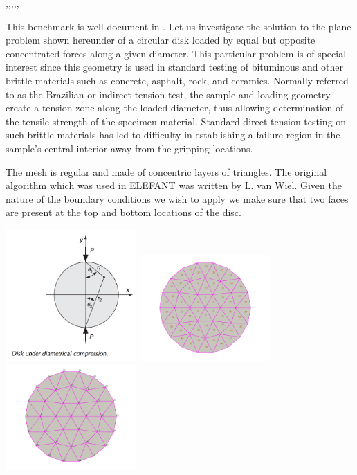 
\Literature \cite{brhb14},\cite{brsp11},\cite{brsp14},\cite{hiok66},\cite{brze95},\cite{wami15}
\cite{wowu95}\cite{zhwd90}


This benchmark is well document in \cite{sadd14}.
Let us investigate the solution to the plane problem shown hereunder of a circular disk 
loaded by equal but opposite concentrated forces along a given diameter. 
This particular problem is of special interest since this geometry is used 
in standard testing of bituminous and other brittle materials such as 
concrete, asphalt, rock, and ceramics. Normally referred to as the Brazilian or indirect tension test, 
the sample and loading geometry create a tension zone along the loaded diameter, 
thus allowing determination of the tensile strength of the specimen material. 
Standard direct tension testing on such brittle materials has led to difficulty 
in establishing a failure region in the sample’s central interior away from 
the gripping locations.

The mesh is regular and made of concentric layers of triangles. The original algorithm
which was used in ELEFANT was written by L. van Wiel.  Given the nature of the boundary 
conditions we wish to apply we make sure that two faces are present at the top and bottom 
locations of the disc. 

\begin{center}
\includegraphics[width=5cm]{python_codes/fieldstone_58/setup}
\includegraphics[width=5cm]{python_codes/fieldstone_58/mesh_elt_nb}
\includegraphics[width=5cm]{python_codes/fieldstone_58/mesh_node_nb}
\end{center}

